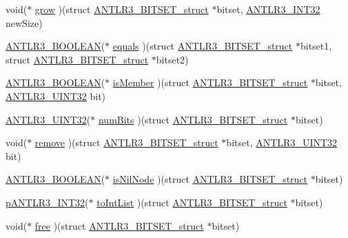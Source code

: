 \begin{DoxyCompactItemize}
void($\ast$ \hyperlink{struct_a_n_t_l_r3___b_i_t_s_e_t__struct_ac960f12142d6cc806a52deccdf11db31}{grow} )(struct \hyperlink{struct_a_n_t_l_r3___b_i_t_s_e_t__struct}{A\-N\-T\-L\-R3\-\_\-\-B\-I\-T\-S\-E\-T\-\_\-struct} $\ast$bitset, \hyperlink{antlr3defs_8h_a6faef5c4687f8eb633d2aefea93973ca}{A\-N\-T\-L\-R3\-\_\-\-I\-N\-T32} new\-Size)
\item 
\hyperlink{antlr3defs_8h_a5b33dccbba3b7212539695e21df4079b}{A\-N\-T\-L\-R3\-\_\-\-B\-O\-O\-L\-E\-A\-N}($\ast$ \hyperlink{struct_a_n_t_l_r3___b_i_t_s_e_t__struct_a94e3dc61f3da71dadfc19c1b31981134}{equals} )(struct \hyperlink{struct_a_n_t_l_r3___b_i_t_s_e_t__struct}{A\-N\-T\-L\-R3\-\_\-\-B\-I\-T\-S\-E\-T\-\_\-struct} $\ast$bitset1, struct \hyperlink{struct_a_n_t_l_r3___b_i_t_s_e_t__struct}{A\-N\-T\-L\-R3\-\_\-\-B\-I\-T\-S\-E\-T\-\_\-struct} $\ast$bitset2)
\item 
\hyperlink{antlr3defs_8h_a5b33dccbba3b7212539695e21df4079b}{A\-N\-T\-L\-R3\-\_\-\-B\-O\-O\-L\-E\-A\-N}($\ast$ \hyperlink{struct_a_n_t_l_r3___b_i_t_s_e_t__struct_af8176cb13102a69cd7163b7912070c44}{is\-Member} )(struct \hyperlink{struct_a_n_t_l_r3___b_i_t_s_e_t__struct}{A\-N\-T\-L\-R3\-\_\-\-B\-I\-T\-S\-E\-T\-\_\-struct} $\ast$bitset, \hyperlink{antlr3defs_8h_ac41f744abd0fd25144b9eb9d11b1dfd1}{A\-N\-T\-L\-R3\-\_\-\-U\-I\-N\-T32} bit)
\item 
\hyperlink{antlr3defs_8h_ac41f744abd0fd25144b9eb9d11b1dfd1}{A\-N\-T\-L\-R3\-\_\-\-U\-I\-N\-T32}($\ast$ \hyperlink{struct_a_n_t_l_r3___b_i_t_s_e_t__struct_ac2391f2f18462a32d3230aa3d4e77749}{num\-Bits} )(struct \hyperlink{struct_a_n_t_l_r3___b_i_t_s_e_t__struct}{A\-N\-T\-L\-R3\-\_\-\-B\-I\-T\-S\-E\-T\-\_\-struct} $\ast$bitset)
\item 
void($\ast$ \hyperlink{struct_a_n_t_l_r3___b_i_t_s_e_t__struct_a2c4b88534ca52e10632aa8b85ac3d951}{remove} )(struct \hyperlink{struct_a_n_t_l_r3___b_i_t_s_e_t__struct}{A\-N\-T\-L\-R3\-\_\-\-B\-I\-T\-S\-E\-T\-\_\-struct} $\ast$bitset, \hyperlink{antlr3defs_8h_ac41f744abd0fd25144b9eb9d11b1dfd1}{A\-N\-T\-L\-R3\-\_\-\-U\-I\-N\-T32} bit)
\item 
\hyperlink{antlr3defs_8h_a5b33dccbba3b7212539695e21df4079b}{A\-N\-T\-L\-R3\-\_\-\-B\-O\-O\-L\-E\-A\-N}($\ast$ \hyperlink{struct_a_n_t_l_r3___b_i_t_s_e_t__struct_adbe68e4b485b04ab96aca86612ad8582}{is\-Nil\-Node} )(struct \hyperlink{struct_a_n_t_l_r3___b_i_t_s_e_t__struct}{A\-N\-T\-L\-R3\-\_\-\-B\-I\-T\-S\-E\-T\-\_\-struct} $\ast$bitset)
\item 
\hyperlink{antlr3defs_8h_a1b47e305e2960dec14a9da11de8cec39}{p\-A\-N\-T\-L\-R3\-\_\-\-I\-N\-T32}($\ast$ \hyperlink{struct_a_n_t_l_r3___b_i_t_s_e_t__struct_a0e2c28acd227ec3216dab2c7faa65760}{to\-Int\-List} )(struct \hyperlink{struct_a_n_t_l_r3___b_i_t_s_e_t__struct}{A\-N\-T\-L\-R3\-\_\-\-B\-I\-T\-S\-E\-T\-\_\-struct} $\ast$bitset)
\item 
void($\ast$ \hyperlink{struct_a_n_t_l_r3___b_i_t_s_e_t__struct_ab3db8527ade03bfcaccc50ba77457590}{free} )(struct \hyperlink{struct_a_n_t_l_r3___b_i_t_s_e_t__struct}{A\-N\-T\-L\-R3\-\_\-\-B\-I\-T\-S\-E\-T\-\_\-struct} $\ast$bitset)
\end{DoxyCompactItemize}


